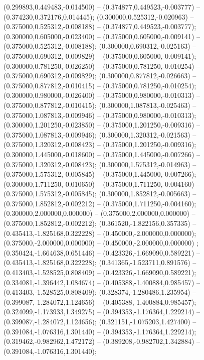  (0.299893,0.449483,-0.014500) -- (0.374877,0.449523,-0.003777) -- (0.374230,0.372176,0.014445);
 (0.300000,0.525312,-0.020963) -- (0.375000,0.525312,-0.008188) -- (0.374877,0.449523,-0.003777);
 (0.300000,0.605000,-0.023400) -- (0.375000,0.605000,-0.009141) -- (0.375000,0.525312,-0.008188);
 (0.300000,0.690312,-0.025163) -- (0.375000,0.690312,-0.009829) -- (0.375000,0.605000,-0.009141);
 (0.300000,0.781250,-0.026250) -- (0.375000,0.781250,-0.010254) -- (0.375000,0.690312,-0.009829);
 (0.300000,0.877812,-0.026663) -- (0.375000,0.877812,-0.010415) -- (0.375000,0.781250,-0.010254);
 (0.300000,0.980000,-0.026400) -- (0.375000,0.980000,-0.010313) -- (0.375000,0.877812,-0.010415);
 (0.300000,1.087813,-0.025463) -- (0.375000,1.087813,-0.009946) -- (0.375000,0.980000,-0.010313);
 (0.300000,1.201250,-0.023850) -- (0.375000,1.201250,-0.009316) -- (0.375000,1.087813,-0.009946);
 (0.300000,1.320312,-0.021563) -- (0.375000,1.320312,-0.008423) -- (0.375000,1.201250,-0.009316);
 (0.300000,1.445000,-0.018600) -- (0.375000,1.445000,-0.007266) -- (0.375000,1.320312,-0.008423);
 (0.300000,1.575312,-0.014963) -- (0.375000,1.575312,-0.005845) -- (0.375000,1.445000,-0.007266);
 (0.300000,1.711250,-0.010650) -- (0.375000,1.711250,-0.004160) -- (0.375000,1.575312,-0.005845);
 (0.300000,1.852812,-0.005663) -- (0.375000,1.852812,-0.002212) -- (0.375000,1.711250,-0.004160);
 (0.300000,2.000000,0.000000) -- (0.375000,2.000000,0.000000) -- (0.375000,1.852812,-0.002212);
 (0.361520,-1.822156,0.357335) -- (0.435413,-1.825168,0.322228) -- (0.450000,-2.000000,0.000000);
 (0.375000,-2.000000,0.000000) -- (0.450000,-2.000000,0.000000) ;
 (0.350424,-1.664638,0.651446) -- (0.423326,-1.669090,0.589221) -- (0.435413,-1.825168,0.322228);
 (0.341365,-1.523711,0.891576) -- (0.413403,-1.528525,0.808409) -- (0.423326,-1.669090,0.589221);
 (0.334081,-1.396442,1.084674) -- (0.405388,-1.400884,0.985457) -- (0.413403,-1.528525,0.808409);
 (0.328374,-1.280486,1.235954) -- (0.399087,-1.284072,1.124656) -- (0.405388,-1.400884,0.985457);
 (0.324099,-1.173933,1.349275) -- (0.394353,-1.176364,1.229214) -- (0.399087,-1.284072,1.124656);
 (0.321151,-1.075203,1.427400) -- (0.391084,-1.076316,1.301440) -- (0.394353,-1.176364,1.229214);
 (0.319462,-0.982962,1.472172) -- (0.389208,-0.982702,1.342884) -- (0.391084,-1.076316,1.301440);
